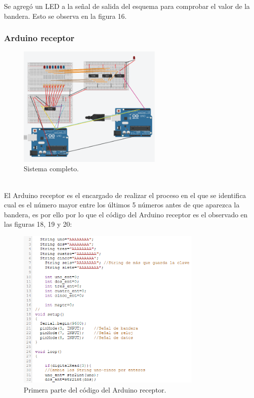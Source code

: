 \documentclass{article}
\begin{document}
Se agregó un LED a la señal de salida del esquema para comprobar el valor de la bandera. Esto se observa en la figura 16.

\newpage
\subsubsection{Arduino receptor}


\begin{figure}[h]
\includegraphics[width=7cm]{sistema_completo.PNG}
\centering
\caption{Sistema completo.}
\label{fig:sistema_completo.PNG}
\end{figure}
\cite{completo}\\


El Arduino receptor es el encargado de realizar el proceso en el que se identifica cual es el número mayor entre los últimos 5 números antes de que aparezca la bandera, es por ello por lo que el código del Arduino receptor es el observado en las figuras 18, 19 y 20:\\

\newpage

\begin{figure}[h]
\includegraphics[width=9cm]{codigo_receptor_1.PNG}
\centering
\caption{Primera parte del código del Arduino receptor. }
\label{fig:codigo_receptor_1.PNG}
\end{figure}
\cite{completo}\\
\end{document}
